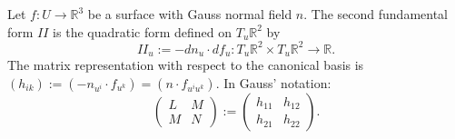 Let $f: U \to \mathbb{R}^3$ be a surface with Gauss normal field $n$. The second fundamental form $II$ is the quadratic form defined on $T_u \mathbb{R}^2$ by
$$II_u := -dn_u \cdot df_u: T_u\mathbb{R}^2 \times T_u\mathbb{R}^2 \to \mathbb{R}.$$
The matrix representation with respect to the canonical basis is $(h_{ik}) := (-n_{u^i} \cdot f_{u^k}) = (n \cdot f_{u^i u^k})$. In Gauss' notation:
$$\begin{pmatrix} L & M \\ M & N \end{pmatrix} := \begin{pmatrix} h_{11} & h_{12} \\ h_{21} & h_{22} \end{pmatrix}.$$